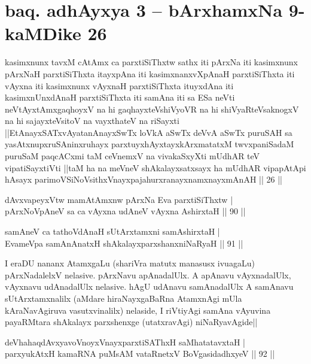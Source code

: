 \section*{baq. adhAyxya 3 -- bArxhamxNa 9-kaMDike 26}

\begin{shl}
kasimxnunx tavxM cAtAmx ca parxtiSiThxtw sathx iti pArxNa iti kasimxnunx pArxNaH parxtiSiThxta itayxpAna iti kasimxnanxvXpAnaH parxtiSiThxta iti vAyxna iti kasimxnunx vAyxnaH parxtiSiThxta ituyxdAna iti kasimxnUnxdAnaH parxtiSiThxta iti samAna iti sa ESa neVti neVtAyxtAmxgaqhoyxV na hi gaqhayxteV\s shiVyoVR na hi shiVyaRteV\s saknogxV na hi sajayxteV\s sitoV na vayxthateV na riSayxti ||EtAnayxSATxvAyatanAnayxSwTx loVkA aSwTx deVvA aSwTx puruSAH sa yasAtxnupxruSAninxruhayx parxtuyxhAyxtayxkArxmatatxM twvxpaniSadaM puruSaM paqcACxmi taM ceVnemxV na vivakaSxyXti mUdhAR teV vipatiSayxtiVti ||taM ha na meVneV shAkalayxsatxsayx ha mUdhAR vipapAtApi hAsayx parimoVSiNoV\s sithxVnayxpajahurxranayxnamxnayxmAnAH || 26 ||
\end{shl}

\begin{shl}
dAvxvapeyxVtw mamA\s \s tAmxnw pArxNa Eva parxtiSiThxtw |\\
pArxNoV\s pAneV sa ca vAyxna udAneV vAyxna AshirxtaH \hfill || 90 ||
\end{shl}

\begin{shl}
samAneV ca tathoVdAnaH sUtArxtamxni samAshirxtaH |\\
EvameVpa samAnAnatxH shAkalayxparxshanxniNaRyaH \hfill || 91 ||
\end{shl}

\begin{artha}
I eraDU nananx AtamxgaLu (shariVra matutx manasusx ivuagaLu) pArxNadalelxV nelasive. pArxNavu apAnadalUlx. A apAnavu vAyxnadalUlx, vAyxnavu udAnadalUlx nelasive. hAgU udAnavu samAnadalUlx A samAnavu sUtArxtamxnalilx (aMdare hiraNayxgaBaRna AtamxnAgi mUla kAraNavAgiruva vasutxvinalilx) nelaside, I riVtiyAgi samAna vAyuvina payaRMtara shAkalayx parxshenxge (utatxravAgi) niNaRyavAgide||
\end{artha}


\begin{shl}
deVhahaqdAvxyavoV\s noyxVnayxparxtiSAThxH saMhatatavxtaH |\\
parxyukAtxH kamaRNA puMsAM vataRnetxV BoVgasidadhxyeV \hfill || 92 ||
\end{shl}


